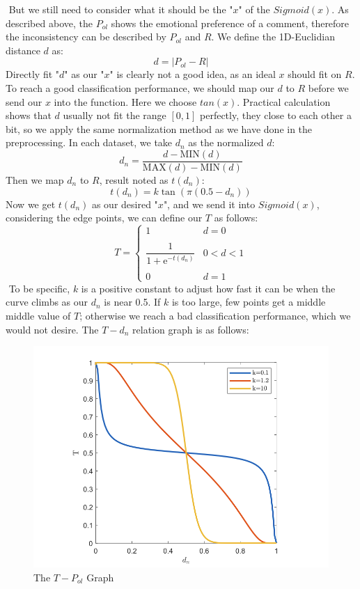 \documentclass[12pt]{article}  %
\begin{document}
​		But we still need to consider what it should be the "$x$" of the $Sigmoid(x)$. As described above, the $P_{ol}$ shows the emotional preference of a comment, therefore the inconsistency can be described by $P_{ol}$ and $R$. We define the 1D-Euclidian distance $d$ as:
$$
d = \vert P_{ol} - R\vert
$$
​		Directly fit "$d$" as our "$x$" is clearly not a good idea, as an ideal $x$ should fit on $R$. To reach a good classification performance, we should map our $d$ to $R$ before we send our $x$ into the function. Here we choose $tan(x)$. Practical calculation shows that $d$ usually not fit the range $[0,1]$ perfectly, they close to each other a bit, so we apply the same normalization method as we have done in the preprocessing. In each dataset, we take $d_{n}$ as the normalized $d$:
$$
d_{n} = \frac{d - \mathrm{MIN}(d)}{\mathrm{MAX}(d) - \mathrm{MIN}(d)}
$$
​		Then we map $d_{n}$ to $R$, result noted as $t(d_{n})$:
$$
t(d_{n}) =k \tan(\pi  (0.5-d_{n}))
$$
​		Now we get $t(d_{n})$ as our desired "$x$", and we send it into $Sigmoid(x)$, considering the edge points, we can define our $T$ as follows:
$$
{T} = \left\{\begin{matrix}
    1 &d=0\\
    \\
    \dfrac{1}{1+\mathrm{e}^{-t(d_{n})}} & 0<d<1\\
    \\
    
0 & d=1
\end{matrix}\right.
$$
​		To be specific, $k$ is a positive constant to adjust how fast it can be when the curve climbs as our $d_{n}$ is near 0.5. If $k$ is too large, few points get a middle middle value of $T$; otherwise we reach a bad classification performance, which we would not desire. The $T-d_{n}$ relation graph is as follows:

\begin{figure}[H]
  \centering
  \includegraphics[width=0.7\linewidth]{Q1picture/Q1dnT.png}
  \caption{The $T - P_{ol}$ Graph}
  \label{fig:}
\end{figure}
\end{document}
